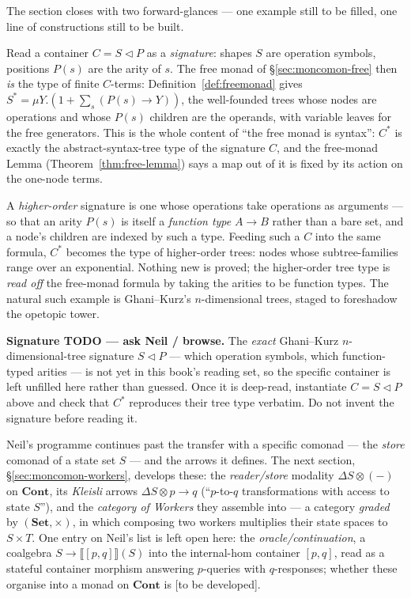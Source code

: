 \documentclass[11pt,a4paper]{book}
\newcommand{\Set}{\mathbf{Set}}
\newcommand{\Cont}{\mathbf{Cont}}
\newcommand{\cont}[2]{#1 \triangleleft #2}
\newcommand{\Ext}[1]{\llbracket #1 \rrbracket}
\theoremstyle{plain}
\theoremstyle{definition}
\theoremstyle{remark}
\begin{document}
The section closes with two forward-glances --- one example still to be filled, one line of
constructions still to be built.

\begin{teachbox}
Read a container $C=\cont S P$ as a \emph{signature}: shapes $S$ are operation symbols, positions
$P(s)$ are the arity of $s$. The free monad of \S\ref{sec:moncomon-free} then \emph{is} the type of
finite $C$-terms: Definition~\ref{def:freemonad} gives $S^{*}=\mu Y.(1+\sum_{s}(P(s)\to Y))$, the
well-founded trees whose nodes are operations and whose $P(s)$ children are the operands, with
variable leaves for the free generators. This is the whole content of ``the free monad is syntax'':
$C^{*}$ is exactly the abstract-syntax-tree type of the signature $C$, and the free-monad Lemma
(Theorem~\ref{thm:free-lemma}) says a map out of it is fixed by its action on the one-node terms.

A \emph{higher-order} signature is one whose operations take operations as arguments --- so that an
arity $P(s)$ is itself a \emph{function type} $A\to B$ rather than a bare set, and a node's children
are indexed by such a type. Feeding such a $C$ into the same formula, $C^{*}$ becomes the type of
higher-order trees: nodes whose subtree-families range over an exponential. Nothing new is proved;
the higher-order tree type is \emph{read off} the free-monad formula by taking the arities to be
function types. The natural such example is Ghani--Kurz's $n$-dimensional trees, staged to
foreshadow the opetopic tower.

\textbf{Signature TODO --- ask Neil / browse.} The \emph{exact} Ghani--Kurz $n$-dimensional-tree
signature $\cont S P$ --- which operation symbols, which function-typed arities --- is not yet in
this book's reading set, so the specific container is left unfilled here rather than guessed. Once
it is deep-read, instantiate $C=\cont S P$ above and check that $C^{*}$ reproduces their tree type
verbatim. Do not invent the signature before reading it.
\end{teachbox}

\begin{teachbox}
Neil's programme continues past the transfer with a specific comonad --- the \emph{store}
comonad of a state set $S$ --- and the arrows it defines. The next section,
\S\ref{sec:moncomon-workers}, develops these: the \emph{reader/store} modality
$\Delta S\otimes(-)$ on $\Cont$, its \emph{Kleisli} arrows $\Delta S\otimes p\to q$
(``$p$-to-$q$ transformations with access to state $S$''), and the \emph{category of Workers}
they assemble into --- a category \emph{graded} by $(\Set,\times)$, in which composing two
workers multiplies their state spaces to $S\times T$. One entry on Neil's list is left open
here: the \emph{oracle/continuation}, a coalgebra $S\to\Ext{[p,q]}(S)$ into the internal-hom
container $[p,q]$, read as a stateful container morphism answering $p$-queries with
$q$-responses; whether these organise into a monad on $\Cont$ is \textsf{[to be developed]}.
\end{teachbox}
\end{document}
